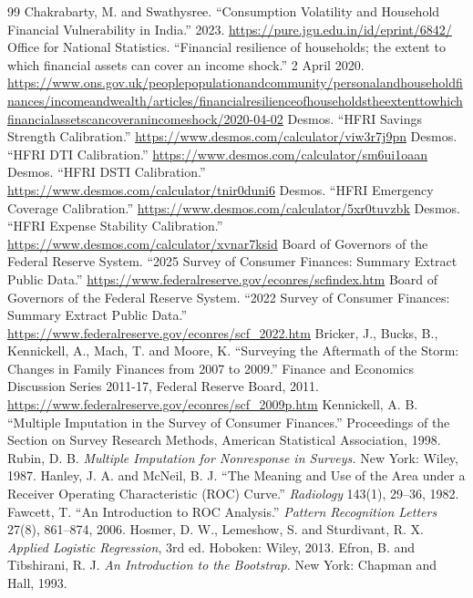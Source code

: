 \documentclass[11pt,a4paper]{article}
\begin{document}
\begin{thebibliography}{99}
 Chakrabarty, M. and Swathysree. ``Consumption Volatility and Household Financial Vulnerability in India.'' 2023. \url{https://pure.jgu.edu.in/id/eprint/6842/}
 Office for National Statistics. ``Financial resilience of households; the extent to which financial assets can cover an income shock.'' 2 April 2020. \url{https://www.ons.gov.uk/peoplepopulationandcommunity/personalandhouseholdfinances/incomeandwealth/articles/financialresilienceofhouseholdstheextenttowhichfinancialassetscancoveranincomeshock/2020-04-02}
 Desmos. ``HFRI Savings Strength Calibration.'' \url{https://www.desmos.com/calculator/viw3r7j9pn}
 Desmos. ``HFRI DTI Calibration.'' \url{https://www.desmos.com/calculator/sm6ui1oaan}
 Desmos. ``HFRI DSTI Calibration.'' \url{https://www.desmos.com/calculator/tnir0duni6}
 Desmos. ``HFRI Emergency Coverage Calibration.'' \url{https://www.desmos.com/calculator/5xr0tuvzbk}
 Desmos. ``HFRI Expense Stability Calibration.'' \url{https://www.desmos.com/calculator/xvnar7ksid}
 Board of Governors of the Federal Reserve System. ``2025 Survey of Consumer Finances: Summary Extract Public Data.'' \url{https://www.federalreserve.gov/econres/scfindex.htm}
 Board of Governors of the Federal Reserve System. ``2022 Survey of Consumer Finances: Summary Extract Public Data.'' \url{https://www.federalreserve.gov/econres/scf_2022.htm}
 Bricker, J., Bucks, B., Kennickell, A., Mach, T. and Moore, K. ``Surveying the Aftermath of the Storm: Changes in Family Finances from 2007 to 2009.'' Finance and Economics Discussion Series 2011-17, Federal Reserve Board, 2011. \url{https://www.federalreserve.gov/econres/scf_2009p.htm}
 Kennickell, A. B. ``Multiple Imputation in the Survey of Consumer Finances.'' Proceedings of the Section on Survey Research Methods, American Statistical Association, 1998.
 Rubin, D. B. \emph{Multiple Imputation for Nonresponse in Surveys.} New York: Wiley, 1987.
 Hanley, J. A. and McNeil, B. J. ``The Meaning and Use of the Area under a Receiver Operating Characteristic (ROC) Curve.'' \emph{Radiology} 143(1), 29--36, 1982.
 Fawcett, T. ``An Introduction to ROC Analysis.'' \emph{Pattern Recognition Letters} 27(8), 861--874, 2006.
 Hosmer, D. W., Lemeshow, S. and Sturdivant, R. X. \emph{Applied Logistic Regression}, 3rd ed. Hoboken: Wiley, 2013.
 Efron, B. and Tibshirani, R. J. \emph{An Introduction to the Bootstrap.} New York: Chapman and Hall, 1993.

\end{thebibliography}
\end{document}
